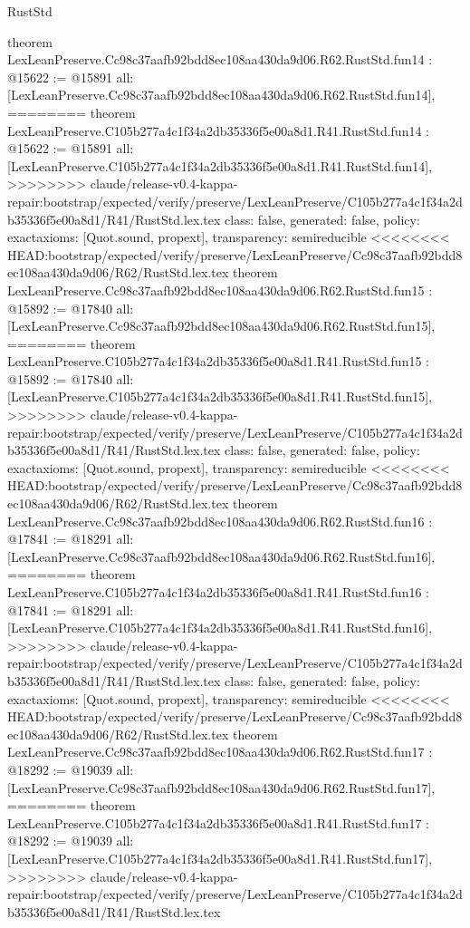 \begin{lexlean}{RustStd}
\begin{coremodule}
{\begin{coremodule}
{{{{{{{{{{{{{{{{theorem LexLeanPreserve.Cc98c37aafb92bdd8ec108aa430da9d06.R62.RustStd.fun14 : @15622 := @15891 {
  all: [LexLeanPreserve.Cc98c37aafb92bdd8ec108aa430da9d06.R62.RustStd.fun14],
========
theorem LexLeanPreserve.C105b277a4c1f34a2db35336f5e00a8d1.R41.RustStd.fun14 : @15622 := @15891 {
  all: [LexLeanPreserve.C105b277a4c1f34a2db35336f5e00a8d1.R41.RustStd.fun14],
>>>>>>>> claude/release-v0.4-kappa-repair:bootstrap/expected/verify/preserve/LexLeanPreserve/C105b277a4c1f34a2db35336f5e00a8d1/R41/RustStd.lex.tex
  class: false,
  generated: false,
  policy: exact{axioms: [Quot.sound, propext]},
  transparency: semireducible
}
<<<<<<<< HEAD:bootstrap/expected/verify/preserve/LexLeanPreserve/Cc98c37aafb92bdd8ec108aa430da9d06/R62/RustStd.lex.tex
theorem LexLeanPreserve.Cc98c37aafb92bdd8ec108aa430da9d06.R62.RustStd.fun15 : @15892 := @17840 {
  all: [LexLeanPreserve.Cc98c37aafb92bdd8ec108aa430da9d06.R62.RustStd.fun15],
========
theorem LexLeanPreserve.C105b277a4c1f34a2db35336f5e00a8d1.R41.RustStd.fun15 : @15892 := @17840 {
  all: [LexLeanPreserve.C105b277a4c1f34a2db35336f5e00a8d1.R41.RustStd.fun15],
>>>>>>>> claude/release-v0.4-kappa-repair:bootstrap/expected/verify/preserve/LexLeanPreserve/C105b277a4c1f34a2db35336f5e00a8d1/R41/RustStd.lex.tex
  class: false,
  generated: false,
  policy: exact{axioms: [Quot.sound, propext]},
  transparency: semireducible
}
<<<<<<<< HEAD:bootstrap/expected/verify/preserve/LexLeanPreserve/Cc98c37aafb92bdd8ec108aa430da9d06/R62/RustStd.lex.tex
theorem LexLeanPreserve.Cc98c37aafb92bdd8ec108aa430da9d06.R62.RustStd.fun16 : @17841 := @18291 {
  all: [LexLeanPreserve.Cc98c37aafb92bdd8ec108aa430da9d06.R62.RustStd.fun16],
========
theorem LexLeanPreserve.C105b277a4c1f34a2db35336f5e00a8d1.R41.RustStd.fun16 : @17841 := @18291 {
  all: [LexLeanPreserve.C105b277a4c1f34a2db35336f5e00a8d1.R41.RustStd.fun16],
>>>>>>>> claude/release-v0.4-kappa-repair:bootstrap/expected/verify/preserve/LexLeanPreserve/C105b277a4c1f34a2db35336f5e00a8d1/R41/RustStd.lex.tex
  class: false,
  generated: false,
  policy: exact{axioms: [Quot.sound, propext]},
  transparency: semireducible
}
<<<<<<<< HEAD:bootstrap/expected/verify/preserve/LexLeanPreserve/Cc98c37aafb92bdd8ec108aa430da9d06/R62/RustStd.lex.tex
theorem LexLeanPreserve.Cc98c37aafb92bdd8ec108aa430da9d06.R62.RustStd.fun17 : @18292 := @19039 {
  all: [LexLeanPreserve.Cc98c37aafb92bdd8ec108aa430da9d06.R62.RustStd.fun17],
========
theorem LexLeanPreserve.C105b277a4c1f34a2db35336f5e00a8d1.R41.RustStd.fun17 : @18292 := @19039 {
  all: [LexLeanPreserve.C105b277a4c1f34a2db35336f5e00a8d1.R41.RustStd.fun17],
>>>>>>>> claude/release-v0.4-kappa-repair:bootstrap/expected/verify/preserve/LexLeanPreserve/C105b277a4c1f34a2db35336f5e00a8d1/R41/RustStd.lex.tex
}}}}}}}}}}}}}}}}}}}}}
\end{coremodule}}
\end{coremodule}
\end{lexlean}
